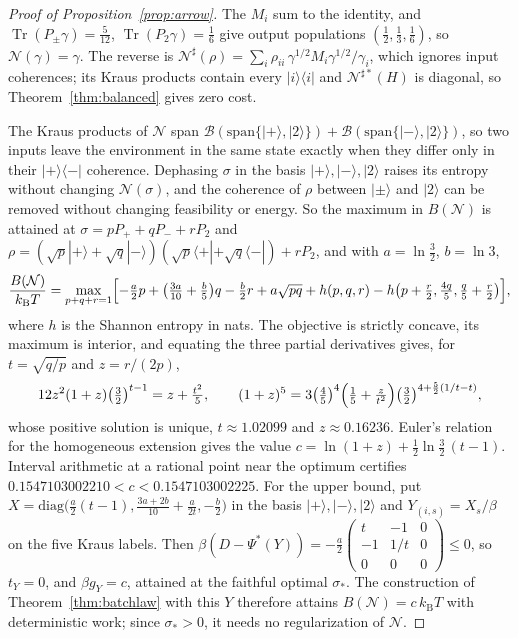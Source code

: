 \documentclass[11pt]{article}
\theoremstyle{definition}
\theoremstyle{remark}
\newcommand{\Tr}{\operatorname{Tr}}
\newcommand{\kB}{k_{\mathrm B}}
\begin{document}
\begin{proof}[Proof of Proposition~\ref{prop:arrow}]
The $M_i$ sum to the identity, and $\Tr(P_\pm\gamma)=\tfrac5{12}$, $\Tr(P_2\gamma)=\tfrac16$ give output populations $(\tfrac12,\tfrac13,\tfrac16)$, so $\mathcal N(\gamma)=\gamma$. The reverse is $\mathcal N^\sharp(\rho)=\sum_i\rho_{ii}\,\gamma^{1/2}M_i\gamma^{1/2}/\gamma_i$, which ignores input coherences; its Kraus products contain every $|i\rangle\langle i|$ and $\mathcal N^{\sharp*}(H)$ is diagonal, so Theorem~\ref{thm:balanced} gives zero cost.

The Kraus products of $\mathcal N$ span $\mathcal B(\mathrm{span}\{|+\rangle,|2\rangle\})+\mathcal B(\mathrm{span}\{|-\rangle,|2\rangle\})$, so two inputs leave the environment in the same state exactly when they differ only in their $|+\rangle\langle-|$ coherence. Dephasing $\sigma$ in the basis $|+\rangle,|-\rangle,|2\rangle$ raises its entropy without changing $\mathcal N(\sigma)$, and the coherence of $\rho$ between $|\pm\rangle$ and $|2\rangle$ can be removed without changing feasibility or energy. So the maximum in $B(\mathcal N)$ is attained at $\sigma=pP_++qP_-+rP_2$ and $\rho=(\sqrt p|+\rangle+\sqrt q|-\rangle)(\sqrt p\langle+|+\sqrt q\langle-|)+rP_2$, and with $a=\ln\frac32$, $b=\ln3$,
\[
\frac{B(\mathcal N)}{\kB T}=\max_{p+q+r=1}\Bigl[-\tfrac a2p+\bigl(\tfrac{3a}{10}+\tfrac b5\bigr)q-\tfrac b2r+a\sqrt{pq}+h(p,q,r)-h\bigl(p+\tfrac r2,\tfrac{4q}5,\tfrac q5+\tfrac r2\bigr)\Bigr],
\]
where $h$ is the Shannon entropy in nats. The objective is strictly concave, its maximum is interior, and equating the three partial derivatives gives, for $t=\sqrt{q/p}$ and $z=r/(2p)$,
\[
12z^2(1+z)\bigl(\tfrac32\bigr)^{t-1}=z+\tfrac{t^2}5,\qquad(1+z)^5=3\bigl(\tfrac45\bigr)^4\Bigl(\tfrac15+\tfrac z{t^2}\Bigr)\bigl(\tfrac32\bigr)^{4+\frac52(1/t-t)},
\]
whose positive solution is unique, $t\approx1.02099$ and $z\approx0.16236$. Euler's relation for the homogeneous extension gives the value $c=\ln(1+z)+\tfrac12\ln\tfrac32\,(t-1)$. Interval arithmetic at a rational point near the optimum certifies $0.1547103002210<c<0.1547103002225$. For the upper bound, put $X=\mathrm{diag}\bigl(\tfrac a2(t-1),\tfrac{3a+2b}{10}+\tfrac a{2t},-\tfrac b2\bigr)$ in the basis $|+\rangle,|-\rangle,|2\rangle$ and $Y_{(i,s)}=X_s/\beta$ on the five Kraus labels. Then $\beta(D-\Psi^*(Y))=-\tfrac a2\left(\begin{smallmatrix}t&-1&0\\-1&1/t&0\\0&0&0\end{smallmatrix}\right)\le0$, so $t_Y=0$, and $\beta g_Y=c$, attained at the faithful optimal $\sigma_*$. The construction of Theorem~\ref{thm:batchlaw} with this $Y$ therefore attains $B(\mathcal N)=c\,\kB T$ with deterministic work; since $\sigma_*>0$, it needs no regularization of $\mathcal N$.
\end{proof}
\end{document}
